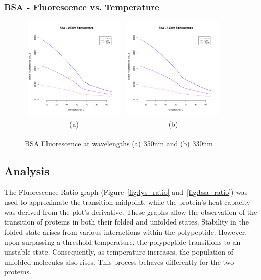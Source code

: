 \documentclass[a4paper,11pt]{article}
\begin{document}
            \subsubsection*{BSA - Fluorescence vs. Temperature}
                \begin{figure}[H]
                    \centering
                    \begin{tabular}{cc}
                        \includegraphics[width=180px]{../resources/unfolding_BSA_350.png} &
                        \includegraphics[width=180px]{../resources/unfolding_BSA_330.png} \\
                        (a) & (b)\\
                    \end{tabular}
                    \caption{BSA Fluorescence at wavelengths (a) 350nm and (b) 330nm}\label{fig:bsa_flr}
                \end{figure}

        \subsection*{Analysis}
            The Fluorescence Ratio graph (Figure~\ref{fig:lys_ratio} and~\ref{fig:bsa_ratio}) was used to 
            approximate the transition midpoint, while the protein's heat capacity was derived from the 
            plot's derivative. 
            These graphs allow the observation of the transition of proteins in both their 
            folded and unfolded states. Stability in the folded state arises from various interactions 
            within the polypeptide. However, upon surpassing a threshold temperature, the polypeptide 
            transitions to an unstable state. Consequently, as temperature increases, the population 
            of unfolded molecules also rises. This process behaves differently for the two proteins. 
\end{document}
